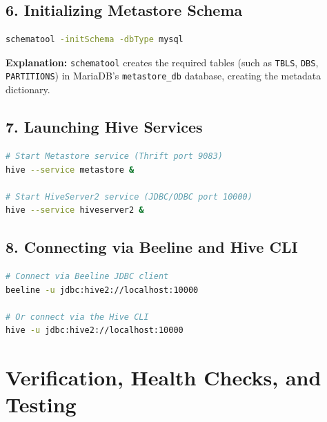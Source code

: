 \documentclass[11pt,a4paper]{article}
\begin{document}
\subsection{6. Initializing Metastore Schema}
\begin{lstlisting}[language=bash, caption={Schema Initialization Command}]
schematool -initSchema -dbType mysql
\end{lstlisting}
\textbf{Explanation:} \texttt{schematool} creates the required tables (such as \texttt{TBLS}, \texttt{DBS}, \texttt{PARTITIONS}) in MariaDB's \texttt{metastore\_db} database, creating the metadata dictionary.

\subsection{7. Launching Hive Services}
\begin{lstlisting}[language=bash, caption={Starting Hive Background Services}]
# Start Metastore service (Thrift port 9083)
hive --service metastore &

# Start HiveServer2 service (JDBC/ODBC port 10000)
hive --service hiveserver2 &
\end{lstlisting}

\subsection{8. Connecting via Beeline and Hive CLI}
\begin{lstlisting}[language=bash, caption={Connecting to Hive}]
# Connect via Beeline JDBC client
beeline -u jdbc:hive2://localhost:10000

# Or connect via the Hive CLI
hive -u jdbc:hive2://localhost:10000
\end{lstlisting}

\section{Verification, Health Checks, and Testing}
\end{document}
